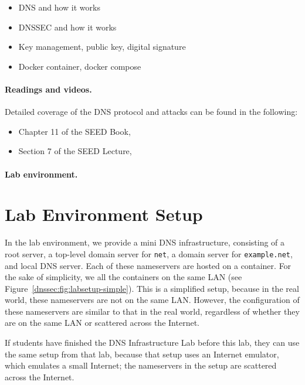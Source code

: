 \begin{itemize}[noitemsep]
\item DNS and how it works
\item DNSSEC and how it works
\item Key management, public key, digital signature 
\item Docker container, docker compose
\end{itemize}


\paragraph{Readings and videos.}
Detailed coverage of the DNS protocol and attacks can be found in the following:

\begin{itemize}
\item Chapter 11 of the SEED Book, \seedisbook
\item Section 7 of the SEED Lecture, \seedisvideo
\end{itemize}


\paragraph{Lab environment.} 
\seedenvironmentB
\nodependency

\section{Lab Environment Setup} 

In the lab environment, we provide a mini DNS infrastructure, consisting 
of a root server, a top-level domain server for \texttt{net}, 
a domain server for \texttt{example.net}, and local DNS server. 
Each of these nameservers are hosted on a container. 
For the sake of simplicity, we all the containers on the same LAN (see 
Figure~\ref{dnssec:fig:labsetup-simple}). This is a simplified setup, 
because in the real world, these nameservers are not on the same LAN.
However, the configuration of these nameservers are similar to that in the 
real world, regardless of whether they are on the same LAN or scattered across
the Internet. 

If students have finished the DNS Infrastructure Lab before this lab,
they can use the same setup from that lab, because 
that setup uses an Internet emulator, which
emulates a small Internet; the nameservers in the setup 
are scattered across the Internet. 

